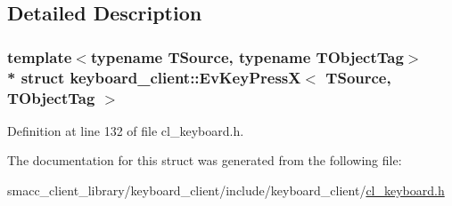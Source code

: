 \subsection{Detailed Description}
\subsubsection*{template$<$typename T\+Source, typename T\+Object\+Tag$>$\\*
struct keyboard\+\_\+client\+::\+Ev\+Key\+Press\+X$<$ T\+Source, T\+Object\+Tag $>$}



Definition at line 132 of file cl\+\_\+keyboard.\+h.



The documentation for this struct was generated from the following file\+:\begin{DoxyCompactItemize}
\item 
smacc\+\_\+client\+\_\+library/keyboard\+\_\+client/include/keyboard\+\_\+client/\hyperlink{cl__keyboard_8h}{cl\+\_\+keyboard.\+h}\end{DoxyCompactItemize}
